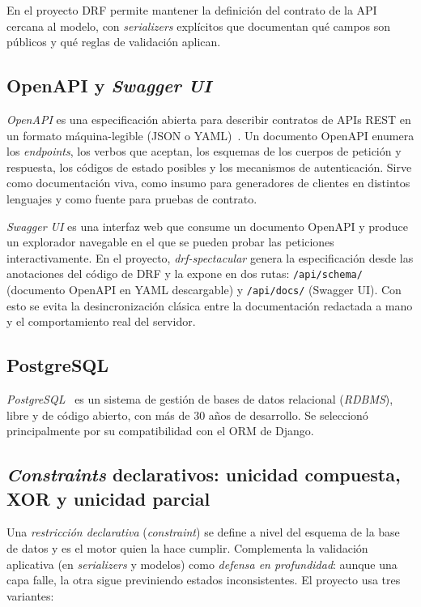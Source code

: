 En el proyecto DRF permite mantener la definición del contrato de la API cercana al modelo, con \emph{serializers} explícitos que documentan qué campos son públicos y qué reglas de validación aplican.

\subsection{OpenAPI y \emph{Swagger UI}}\label{subsec:openapi}

\emph{OpenAPI} es una especificación abierta para describir contratos de APIs REST en un formato máquina-legible (JSON o YAML)~\cite{openapi2021}. Un documento OpenAPI enumera los \emph{endpoints}, los verbos que aceptan, los esquemas de los cuerpos de petición y respuesta, los códigos de estado posibles y los mecanismos de autenticación. Sirve como documentación viva, como insumo para generadores de clientes en distintos lenguajes y como fuente para pruebas de contrato.

\emph{Swagger UI} es una interfaz web que consume un documento OpenAPI y produce un explorador navegable en el que se pueden probar las peticiones interactivamente. En el proyecto, \emph{drf-spectacular} genera la especificación desde las anotaciones del código de DRF y la expone en dos rutas: \texttt{/api/schema/} (documento OpenAPI en YAML descargable) y \texttt{/api/docs/} (Swagger UI). Con esto se evita la desincronización clásica entre la documentación redactada a mano y el comportamiento real del servidor.

\subsection{PostgreSQL}

\emph{PostgreSQL}~\cite{postgres2024} es un sistema de gestión de bases de datos relacional (\emph{RDBMS}), libre y de código abierto, con más de 30 años de desarrollo. Se seleccionó principalmente por su compatibilidad con el ORM de Django.

\subsection{\emph{Constraints} declarativos: unicidad compuesta, XOR y unicidad parcial}\label{subsec:constraints}

Una \emph{restricción declarativa} (\emph{constraint}) se define a nivel del esquema de la base de datos y es el motor quien la hace cumplir. Complementa la validación aplicativa (en \emph{serializers} y modelos) como \emph{defensa en profundidad}: aunque una capa falle, la otra sigue previniendo estados inconsistentes. El proyecto usa tres variantes:

